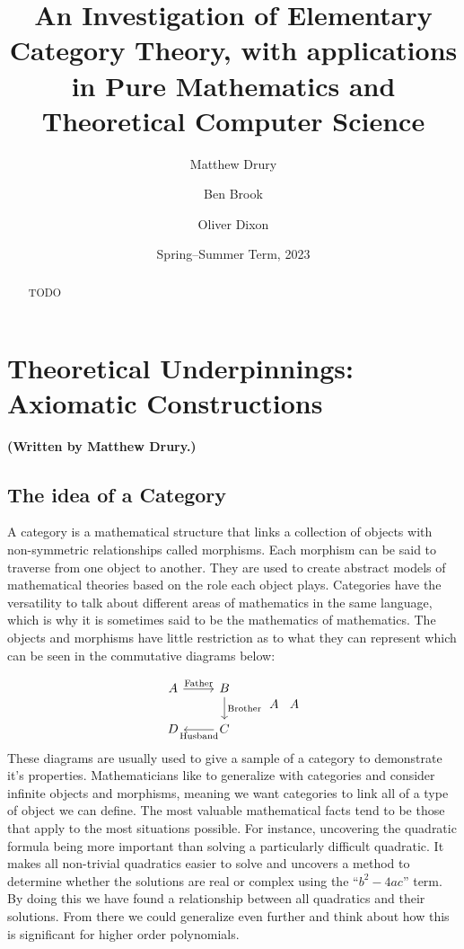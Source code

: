 \documentclass[10pt,a4paper,reqno]{amsart}
\title[An Investigation of Elementary Category Theory]{An Investigation of %
        Elementary Category Theory, with applications in Pure Mathematics and %
        Theoretical Computer Science}
\author{Matthew Drury} \email{\yorkemail{md1499}}
\author{Ben Brook}     \email{\yorkemail{bb1170}}
\author{Oliver Dixon}  \email{\yorkemail{od641}}
\date{Spring--Summer Term, 2023}
\begin{document}
\begin{abstract}
        TODO
\end{abstract}
\maketitle
\tableofcontents
\section{Theoretical %
        Underpinnings: Axiomatic Constructions}
\begin{flushright}
        \textbf{(Written by Matthew Drury.)}
\end{flushright}

\subsection{The idea of a Category}
A category is a mathematical structure that links a collection of objects with
non-symmetric relationships called morphisms.  Each morphism can be said to
traverse from one object to another.  They are used to create abstract models of
mathematical theories based on the role each object plays.  Categories have the
versatility to talk about different areas of mathematics in the same language,
which is why it is sometimes said to be the mathematics of mathematics.   
The objects and morphisms have little restriction as to what they can represent
which can be seen in the commutative diagrams below:

\begin{equation}
        \begin{tikzcd}
                A \ar[r,"\text{Father}"] & B \ar[d,"\text{Brother}"] \\
                D & C \ar[l,"\text{Husband}"]
        \end{tikzcd}
        \begin{tikzcd}
        A
        \end{tikzcd}
        \begin{tikzcd}
        A
        \end{tikzcd}
\end{equation}
These diagrams are usually used to give a sample of a category to demonstrate
it's properties.  Mathematicians like to generalize with categories and consider
infinite objects and morphisms, meaning we want categories to link all of a type 
of object we can define.   The most valuable mathematical facts
tend to be those that apply to the most situations possible.  For instance,
uncovering the quadratic formula being more important than solving a
particularly difficult quadratic.  It makes all non-trivial quadratics easier to
solve and uncovers a method to determine whether the solutions are real or
complex using the ``$b^2-4ac$'' term.   By doing this we have found a relationship
between all quadratics and their solutions.   From there we could generalize even
further and think about how this is significant for higher order polynomials.
\end{document}
